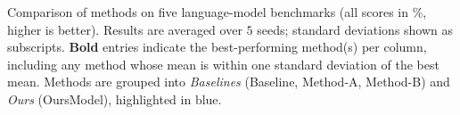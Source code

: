 \caption{Comparison of methods on five language-model benchmarks (all scores in \%, higher is better). Results are averaged over $5$ seeds; standard deviations shown as subscripts. \textbf{Bold} entries indicate the best-performing method(s) per column, including any method whose mean is within one standard deviation of the best mean. Methods are grouped into \emph{Baselines} (Baseline, Method-A, Method-B) and \emph{Ours} (OursModel), highlighted in blue.}
